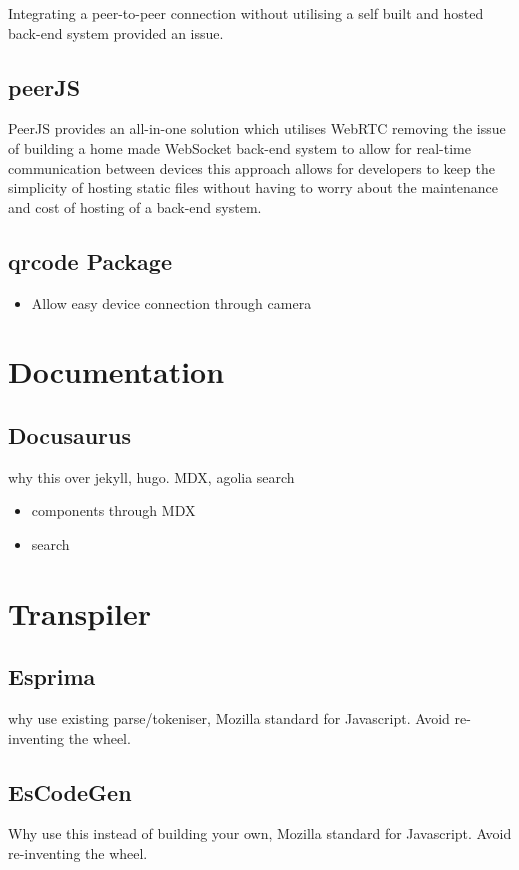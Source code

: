 \documentclass{l4proj}
\begin{document}
Integrating a peer-to-peer connection without utilising a self built and hosted back-end system provided an issue.

\subsection{peerJS}
\text PeerJS provides an all-in-one solution which utilises WebRTC removing the issue of building a home made WebSocket back-end system to allow for real-time communication between devices this approach allows for developers to keep the simplicity of hosting static files without having to worry about the maintenance and cost of hosting of a back-end system.

\subsection{qrcode Package }
\begin{itemize}
    \item Allow easy device connection through camera
\end{itemize}

\section{Documentation }

\subsection{Docusaurus }
\text why this over jekyll, hugo. MDX, agolia search
\begin{itemize}
    \item components through MDX
    \item search
\end{itemize}

\section{Transpiler }

\subsection{Esprima }
\text why use existing parse/tokeniser, Mozilla standard for Javascript. Avoid re-inventing the wheel.
\subsection{EsCodeGen }
\text Why use this instead of building your own, Mozilla standard for Javascript. Avoid re-inventing the wheel.
\end{document}
